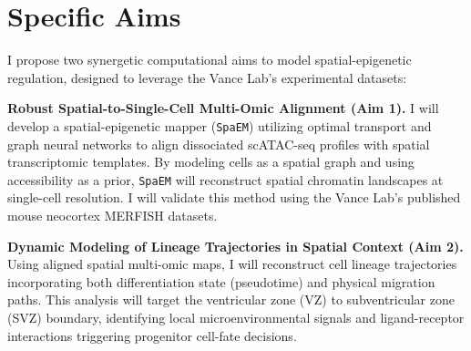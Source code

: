 \section{Specific Aims}
I propose two synergetic computational aims to model spatial-epigenetic regulation, designed to leverage the Vance Lab's experimental datasets:

\begin{aimlist}
  \item \textbf{Robust Spatial-to-Single-Cell Multi-Omic Alignment (Aim 1).}
  I will develop a spatial-epigenetic mapper (\texttt{SpaEM}) utilizing optimal transport and graph neural networks to align dissociated scATAC-seq profiles with spatial transcriptomic templates. By modeling cells as a spatial graph and using accessibility as a prior, \texttt{SpaEM} will reconstruct spatial chromatin landscapes at single-cell resolution. I will validate this method using the Vance Lab's published mouse neocortex MERFISH datasets.
  
  \item \textbf{Dynamic Modeling of Lineage Trajectories in Spatial Context (Aim 2).}
  Using aligned spatial multi-omic maps, I will reconstruct cell lineage trajectories incorporating both differentiation state (pseudotime) and physical migration paths. This analysis will target the ventricular zone (VZ) to subventricular zone (SVZ) boundary, identifying local microenvironmental signals and ligand-receptor interactions triggering progenitor cell-fate decisions.
\end{aimlist}
